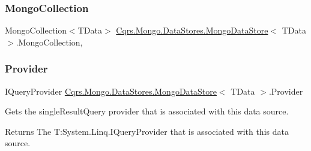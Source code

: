 \subsubsection{\texorpdfstring{Mongo\+Collection}{MongoCollection}}
{\footnotesize\ttfamily Mongo\+Collection$<$T\+Data$>$ \hyperlink{classCqrs_1_1Mongo_1_1DataStores_1_1MongoDataStore}{Cqrs.\+Mongo.\+Data\+Stores.\+Mongo\+Data\+Store}$<$ T\+Data $>$.Mongo\+Collection\hspace{0.3cm}{\ttfamily [get]}, {\ttfamily [protected]}}

\mbox{\label{classCqrs_1_1Mongo_1_1DataStores_1_1MongoDataStore_ae5de32a7a0da67a8aeaed9653db796ce_ae5de32a7a0da67a8aeaed9653db796ce}} 
\subsubsection{\texorpdfstring{Provider}{Provider}}
{\footnotesize\ttfamily I\+Query\+Provider \hyperlink{classCqrs_1_1Mongo_1_1DataStores_1_1MongoDataStore}{Cqrs.\+Mongo.\+Data\+Stores.\+Mongo\+Data\+Store}$<$ T\+Data $>$.Provider\hspace{0.3cm}{\ttfamily [get]}}



Gets the single\+Result\+Query provider that is associated with this data source. 

\begin{DoxyReturn}{Returns}
The T\+:\+System.\+Linq.\+I\+Query\+Provider that is associated with this data source. 
\end{DoxyReturn}
